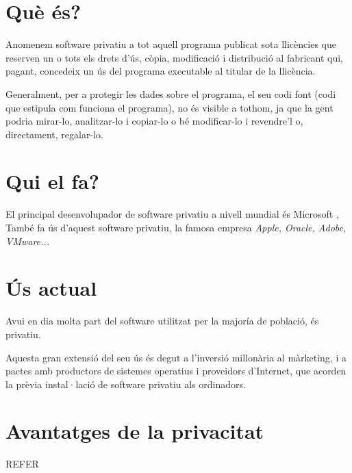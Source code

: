 \section{Què és?}

Anomenem software privatiu a tot aquell programa publicat sota llicències
que reserven un o tots els drets d'ús, còpia, modificació i distribució
al fabricant qui, pagant, concedeix un ús del programa executable al titular
de la llicència.

Generalment, per a protegir les dades sobre el programa, el seu codi font
(codi que estipula com funciona el programa), no és visible a tothom, ja 
que la gent podria mirar-lo, analitzar-lo i copiar-lo o bé modificar-lo i
revendre'l o, directament, regalar-lo. \cite{wikipediapropietari}\cite{gnucategories}

\section{Qui el fa?}

El principal desenvolupador de software privatiu a nivell mundial és Microsoft
\cite{gnumicrosoft}, 
També fa ús d'aquest software privatiu, la famosa empresa \emph{Apple, Oracle, Adobe,
VMware...}

\section{Ús actual}

Avui en dia molta part del software utilitzat per la majoría de població, és privatiu.

Aquesta gran extensió del seu ús és degut a l'inversió millonària al màrketing, i a
pactes amb productors de sistemes operatius i proveidors d'Internet, que acorden la
prèvia instal·lació de software privatiu als ordinadors.

\section{Avantatges de la privacitat}

REFER


